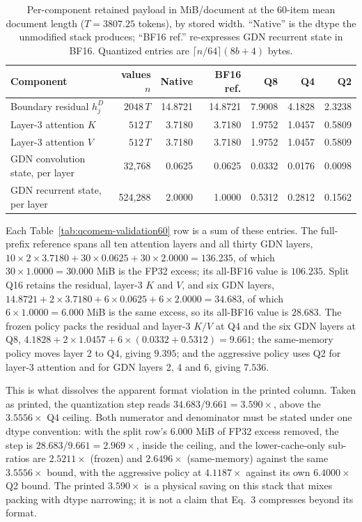 \documentclass{article}
\begin{document}
\begin{table}[H]
  \caption{Per-component retained payload in MiB/document at the 60-item mean
document length ($T=3807.25$ tokens), by stored width.  ``Native'' is the dtype
the unmodified stack produces; ``BF16 ref.'' re-expresses GDN recurrent state
in BF16.  Quantized entries are $\lceil n/64\rceil(8b+4)$ bytes.}
  \label{tab:store-components}
  \centering\small
  \begin{tabular}{@{}lrrrrrr@{}}
    \toprule
    Component & values $n$ & Native & BF16 ref. & Q8 & Q4 & Q2 \\
    \midrule
    Boundary residual $h_j^D$ & $2048\,T$ & 14.8721 & 14.8721 & 7.9008 & 4.1828 & 2.3238 \\
    Layer-3 attention $K$ & $512\,T$ & 3.7180 & 3.7180 & 1.9752 & 1.0457 & 0.5809 \\
    Layer-3 attention $V$ & $512\,T$ & 3.7180 & 3.7180 & 1.9752 & 1.0457 & 0.5809 \\
    GDN convolution state, per layer & 32{,}768 & 0.0625 & 0.0625 & 0.0332 & 0.0176 & 0.0098 \\
    GDN recurrent state, per layer & 524{,}288 & 2.0000 & 1.0000 & 0.5312 & 0.2812 & 0.1562 \\
    \bottomrule
  \end{tabular}
\end{table}

Each Table~\ref{tab:qcomem-validation60} row is a sum of these entries.  The
full-prefix reference spans all ten attention layers and all thirty GDN layers,
$10\times2\times3.7180+30\times0.0625+30\times2.0000=136.235$, of which
$30\times1.0000=30.000$ MiB is the FP32 excess; its all-BF16 value is
$106.235$.  Split Q16 retains the residual, layer-3 $K$ and $V$, and six GDN
layers, $14.8721+2\times3.7180+6\times0.0625+6\times2.0000=34.683$, of which
$6\times1.0000=6.000$ MiB is the same excess, so its all-BF16 value is
$28.683$.  The frozen policy packs the residual and layer-3 $K/V$ at Q4 and the
six GDN layers at Q8, $4.1828+2\times1.0457+6\times(0.0332+0.5312)=9.661$; the
same-memory policy moves layer 2 to Q4, giving $9.395$; and the aggressive
policy uses Q2 for layer-3 attention and for GDN layers 2, 4 and 6, giving
$7.536$.

This is what dissolves the apparent format violation in the printed column.
Taken as printed, the quantization step reads $34.683/9.661=3.590\times$, above
the $3.5556\times$ Q4 ceiling.  Both numerator and denominator must be stated
under one dtype convention: with the split row's $6.000$ MiB of FP32 excess
removed, the step is $28.683/9.661=2.969\times$, inside the ceiling, and the
lower-cache-only sub-ratios are $2.5211\times$ (frozen) and $2.6496\times$
(same-memory) against the same $3.5556\times$ bound, with the aggressive policy
at $4.1187\times$ against its own $6.4000\times$ Q2 bound.  The printed
$3.590\times$ is a physical saving on this stack that mixes packing with dtype
narrowing; it is not a claim that Eq.~3 compresses beyond its format.
\end{document}

